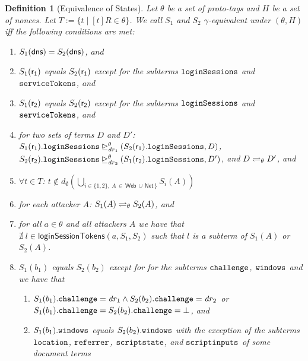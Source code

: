 \documentclass[letterpaper,onecolumn,10pt]{article}
\newtheorem{definition}{Definition}
\begin{document}
\begin{definition}[Equivalence of States]\label{def:eq-of-states}
  Let $\theta$ be a set of proto-tags and $H$ be a set of nonces. 
  Let $T:=\{t\mid [t]R\in \theta\}$. 
  We call $S_1$ and $S_2$ \emph{$\gamma$-equivalent under $(\theta, H)$} 
  iff the following conditions are met:
  \begin{enumerate}
  \item\label{eqs:dns} $S_1(\fAP{dns}) = S_2(\fAP{dns})$, and
  \item\label{eqs:r1} $S_1(\fAP{r_1})$ equals $S_2(\fAP{r_1})$ except
    for the subterms $\str{loginSessions}$ and $\str{serviceTokens}$, and
  \item\label{eqs:r2} $S_1(\fAP{r_2})$ equals $S_2(\fAP{r_2})$ except
    for the subterms $\str{loginSessions}$ and $\str{serviceTokens}$, and
  \item\label{eqs:logsess} for two sets of terms $D$ and $D'$:
    $\logsessminus{S_1(\fAP{r_1}).\str{loginSessions}}{S_2(\fAP{r_1}).\str{loginSessions}}{\theta}{\mi{dr}_1}{D}$,
    $\logsessminus{S_2(\fAP{r_2}).\str{loginSessions}}{S_1(\fAP{r_2}).\str{loginSessions}}{\theta}{\mi{dr}_2}{D'}$,
    and $D \prototagequiv{\theta} D'$, and
  \item\label{eqs:att-not-t} $\forall t \in T$:
    $t \not\in d_\emptyset(\bigcup_{i \in \{1,2\},\ A\, \in\, \mathsf{Web}\, \cup \,
    \mathsf{Net}\, 
    \}}S_i(A))$
  \item\label{eqs:att} for each attacker $A$:
    $S_1(A) \prototagequiv{\theta} S_2(A)$, and
  \item\label{eqs:att-not-l} for all $a\in\theta$ and all attackers $A$ we have that
    $\nexists\ l \in \mathsf{loginSessionTokens}(a,S_1,S_2)$ such that
    $l$ is a subterm of $S_1(A)$ or $S_2(A)$.
  \item\label{eqs:b} $S_1(b_1)$ equals $S_2(b_2)$ except for for the
    subterms $\str{challenge}$, $\str{windows}$
    and we have that
    \begin{enumerate}
    \item \label{eqs:b:challenge}
      $S_1(b_1).\str{challenge} = \mi{dr}_1 \wedge
      S_2(b_2).\str{challenge} = \mi{dr}_2$
      or $S_1(b_1).\str{challenge} = S_2(b_2).\str{challenge} = \bot$,
      and
    \item $S_1(b_1).\str{windows}$ equals $S_2(b_2).\str{windows}$ with
      the exception of the subterms $\str{location}$, $\str{referrer}$,
      $\str{scriptstate}$, and $\str{scriptinputs}$ of some document terms

\end{enumerate}
\end{enumerate}
\end{definition}
\end{document}
